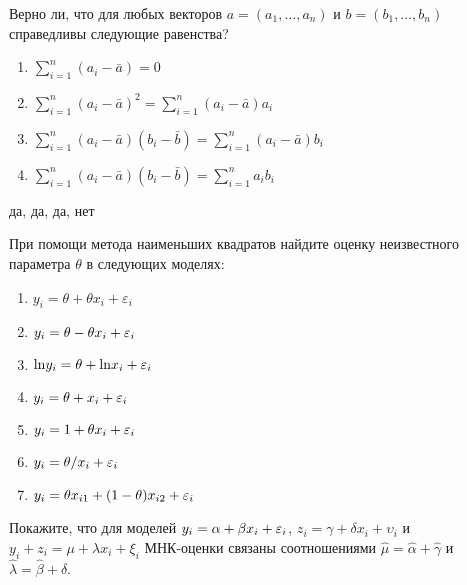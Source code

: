 \documentclass[pdftex,11pt,openany]{book}\usepackage[]{graphicx}\usepackage[]{color}
\begin{document}
\begin{problem}
 Верно ли, что для любых векторов $a = (a_1,\dots,a_n)$ и $b = (b_1,\dots,b_n)$ справедливы следующие равенства?
\begin{enumerate}
\item $\sum_{i=1}^n {(a_i-\bar a)} = 0$
\item $\sum_{i=1}^n {(a_i-\bar a)^2} = \sum_{i=1}^n {(a_i-\bar a)a_i}$
\item $\sum_{i=1}^n {(a_i-\bar a)(b_i-\bar b)} = \sum_{i=1}^n {(a_i-\bar a)b_i}$
\item $\sum_{i=1}^n {(a_i-\bar a)(b_i-\bar b)} = \sum_{i=1}^n {a_i b_i}$
\end{enumerate}
\end{problem}

\begin{solution}
 да, да, да, нет
\end{solution}




\begin{problem}
 При помощи метода наименьших квадратов найдите оценку неизвестного параметра $\theta$ в следующих моделях:

\begin{enumerate}
\item $y_i = \theta + \theta x_i + \varepsilon_i$
\item $y_i = \theta - \theta x_i + \varepsilon_i$
\item $\text{ln} y_i = \theta + \text{ln} x_i + \varepsilon_i$
\item $y_i = \theta + x_i + \varepsilon_i$
\item $y_i = 1 + \theta x_i + \varepsilon_i$
\item $y_i = \theta / x_i + \varepsilon_i$
\item $y_i = \theta x_{i1} + (1-\theta)x_{i2}+\varepsilon_i$
\end{enumerate}
\end{problem}

\begin{solution}
\end{solution}

\begin{problem}
 Покажите, что для моделей $y_i= \alpha + \beta x_i + \varepsilon_i$, $z_i = \gamma + \delta x_i + \upsilon_i$ и $y_i + z_i = \mu + \lambda x_i + \xi_i$ МНК-оценки связаны соотношениями $\hat{\mu}=\hat{\alpha}+\hat{\gamma}$ и $\hat{\lambda}=\hat{\beta} + \hat{\delta}$.
\end{problem}

\begin{solution}
\end{solution}
\end{document}
